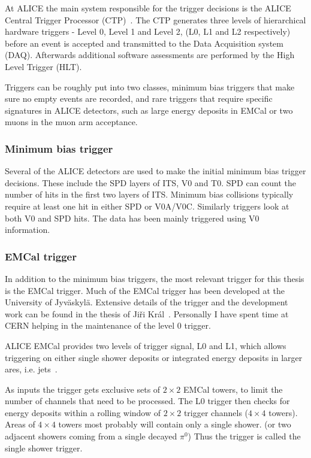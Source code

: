 At ALICE the main system responsible for the trigger decisions is the ALICE Central Trigger Processor (CTP)~\cite{ctp}. The CTP generates three levels of hierarchical hardware triggers - Level 0, Level 1 and Level 2, (L0, L1 and L2 respectively) before an event is accepted and transmitted to the Data Acquisition system (DAQ). Afterwards additional software assessments are performed by the High Level Trigger (HLT).

Triggers can be roughly put into two classes, minimum bias triggers that make sure no empty events are recorded, and rare triggers that require specific signatures in ALICE detectors, such as large energy deposits in EMCal or two muons in the muon arm acceptance.

\subsubsection*{Minimum bias trigger}
Several of the ALICE detectors are used to make the initial minimum bias trigger decisions. These include the SPD layers of ITS, V0 and T0. SPD can count the number of hits in the first two layers of ITS. Minimum bias \pp collisions typically require at least one hit in either SPD or V0A/V0C. Similarly \PbPb triggers look at both V0 and SPD hits. The \pPb data has been mainly triggered using V0 information.


\subsubsection*{EMCal trigger}
In addition to the minimum bias triggers, the most relevant trigger for this thesis is the EMCal trigger. Much of the EMCal trigger has been developed at the University of Jyväskylä. Extensive details of the trigger and the development work can be found in the thesis of Ji\v ri Král~\cite{JiriThesis}. Personally I have spent time at CERN helping in the maintenance of the level 0 trigger.

ALICE EMCal provides two levels of trigger signal, L0 and L1, which allows triggering on either single shower deposits or integrated energy deposits in larger ares, i.e. jets~\cite{KRAL2012261}.

As inputs the trigger gets exclusive sets of $2\times2$ EMCal towers, to limit the number of channels that need to be processed. The L0 trigger then checks for energy deposits within a rolling window of $2\times2$ trigger channels ($4\times4$ towers). Areas of $4\times4$ towers most probably will contain only a single shower. (or two adjacent showers coming from a single decayed $\pi^0$) Thus the trigger is called the single shower trigger. 

